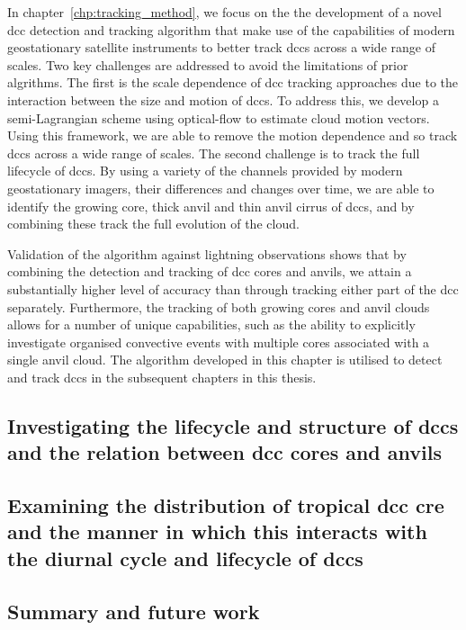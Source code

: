In chapter~\ref{chp:tracking_method}, we focus on the the development of a novel \acrshort{dcc} detection and tracking algorithm that make use of the capabilities of modern geostationary satellite instruments to better track \acrshort{dcc}s across a wide range of scales.
Two key challenges are addressed to avoid the limitations of prior algrithms.
The first is the scale dependence of \acrshort{dcc} tracking approaches due to the interaction between the size and motion of \acrshort{dcc}s.
To address this, we develop a semi-Lagrangian scheme using optical-flow to estimate cloud motion vectors.
Using this framework, we are able to remove the motion dependence and so track \acrshort{dcc}s across a wide range of scales.
The second challenge is to track the full lifecycle of \acrshort{dcc}s.
By using a variety of the channels provided by modern geostationary imagers, their differences and changes over time, we are able to identify the growing core, thick anvil and thin anvil cirrus of \acrshort{dcc}s, and by combining these track the full evolution of the cloud.

Validation of the algorithm against lightning observations shows that by combining the detection and tracking of \acrshort{dcc} cores and anvils, we attain a substantially higher level of accuracy than through tracking either part of the \acrshort{dcc} separately.
Furthermore, the tracking of both growing cores and anvil clouds allows for a number of unique capabilities, such as the ability to explicitly investigate organised convective events with multiple cores associated with a single anvil cloud.
The algorithm developed in this chapter is utilised to detect and track \acrshort{dcc}s in the subsequent chapters in this thesis.


\subsection{Investigating the lifecycle and structure of \acrshort{dcc}s and the relation between \acrshort{dcc} cores and anvils}


\subsection{Examining the distribution of tropical \acrshort{dcc} \acrshort{cre} and the manner in which this interacts with the diurnal cycle and lifecycle of \acrshort{dcc}s}


\subsection{Summary and future work}

